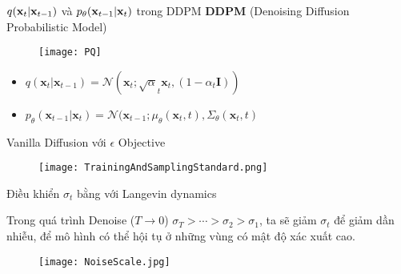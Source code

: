 \begin{frame}{$q(\mathbf{x}_t | \mathbf{x}_{t-1})$ và $p_{\theta}(\mathbf{x}_{t-1} | \mathbf{x}_t ) $  trong DDPM }
	\textbf{DDPM} (Denoising Diffusion Probabilistic Model)
\begin{figure}
	\centering
	\texttt{[image: PQ]}
\end{figure}
	
\begin{itemize}
	\item $q (\mathbf{x}_{t} | \mathbf{x}_{t-1}) = \mathcal{N}(\mathbf{x}_t; \sqrt{\alpha}_t \mathbf{x}_t, (1 - \alpha_t \mathbf{I}))$
	\item $p_\theta (\mathbf{x}_{t-1} | \mathbf{x}_{t}) = \mathcal{N}(\mathbf{x}_{t-1}; \mu_\theta{(\mathbf{x}_t, t)}, {\Sigma}_{\theta} {  (\mathbf{x}_t, t ) }$
\end{itemize}
%
%
%

\end{frame}

\begin{frame}{Vanilla Diffusion với $\epsilon$ Objective}
	\begin{figure}
		\centering
		\texttt{[image: TrainingAndSamplingStandard.png]}
	\end{figure}
\end{frame}

\begin{frame}{Điều khiển $\sigma_t$ bằng với Langevin dynamics}
	
Trong quá trình Denoise ($T \rightarrow 0$)  $\sigma_T > \cdots  >  \sigma_2 > \sigma_1$, ta sẽ giảm $\sigma_t$ để giảm dần nhiễu, để mô hình có thể hội tụ ở những vùng có mật độ xác xuất cao.
	\begin{figure}
		\centering
		\texttt{[image: NoiseScale.jpg]}
	\end{figure}
\end{frame}

